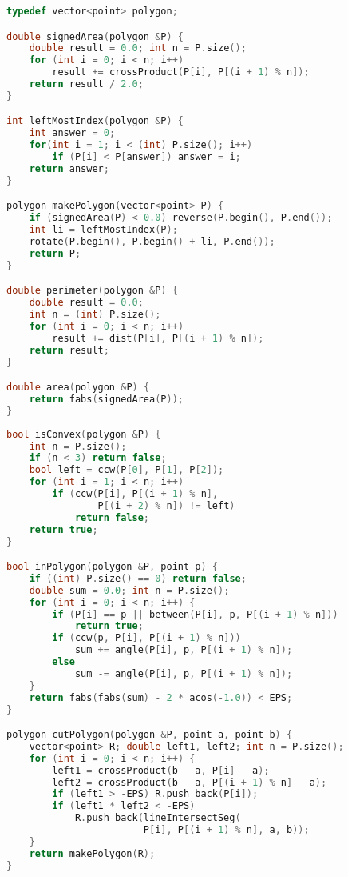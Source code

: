 \begin{lstlisting}[language=C++, title=Parte I de II]
typedef vector<point> polygon;

double signedArea(polygon &P) {
	double result = 0.0; int n = P.size();
	for (int i = 0; i < n; i++)
		result += crossProduct(P[i], P[(i + 1) % n]);
	return result / 2.0;
}

int leftMostIndex(polygon &P) {
	int answer = 0;
	for(int i = 1; i < (int) P.size(); i++)
		if (P[i] < P[answer]) answer = i;
	return answer;
}

polygon makePolygon(vector<point> P) {
	if (signedArea(P) < 0.0) reverse(P.begin(), P.end());
	int li = leftMostIndex(P);
	rotate(P.begin(), P.begin() + li, P.end());
	return P;
}

double perimeter(polygon &P) {
	double result = 0.0;
	int n = (int) P.size();
	for (int i = 0; i < n; i++)
		result += dist(P[i], P[(i + 1) % n]);
	return result;
}

double area(polygon &P) {
	return fabs(signedArea(P));
}
\end{lstlisting}

\newpage

\begin{lstlisting}[language=C++, title=Parte II de II]
bool isConvex(polygon &P) {
	int n = P.size();
	if (n < 3) return false;
	bool left = ccw(P[0], P[1], P[2]);
	for (int i = 1; i < n; i++)
		if (ccw(P[i], P[(i + 1) % n], 
		        P[(i + 2) % n]) != left)
			return false;
	return true;
}

bool inPolygon(polygon &P, point p) {
	if ((int) P.size() == 0) return false;
	double sum = 0.0; int n = P.size();
	for (int i = 0; i < n; i++) {
		if (P[i] == p || between(P[i], p, P[(i + 1) % n]))
			return true;
		if (ccw(p, P[i], P[(i + 1) % n]))
			sum += angle(P[i], p, P[(i + 1) % n]);
		else
			sum -= angle(P[i], p, P[(i + 1) % n]);
	}
	return fabs(fabs(sum) - 2 * acos(-1.0)) < EPS;
}

polygon cutPolygon(polygon &P, point a, point b) {
	vector<point> R; double left1, left2; int n = P.size();
	for (int i = 0; i < n; i++) {
		left1 = crossProduct(b - a, P[i] - a);
		left2 = crossProduct(b - a, P[(i + 1) % n] - a);
		if (left1 > -EPS) R.push_back(P[i]);
		if (left1 * left2 < -EPS)
			R.push_back(lineIntersectSeg(
			            P[i], P[(i + 1) % n], a, b));
	}
	return makePolygon(R);
}
\end{lstlisting}